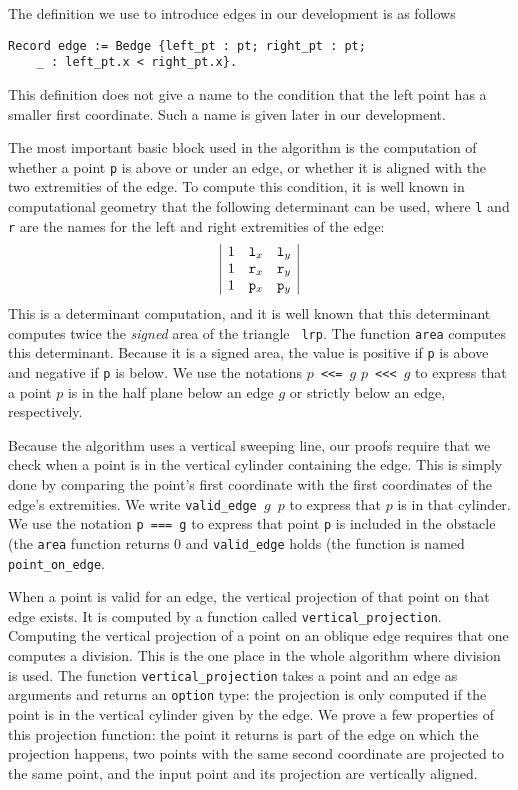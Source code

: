 \documentclass[a4paper, USenglish, cleveref, autoref, thm-restate]{lipics-v2021}
\begin{document}
The definition we use to introduce edges in our development is as
follows
\begin{verbatim}
Record edge := Bedge {left_pt : pt; right_pt : pt;
    _ : left_pt.x < right_pt.x}.
\end{verbatim}
This definition does not give a name to the condition that the left
point has a smaller first coordinate.  Such a name is given later in
our development.

The most important basic block used in the algorithm is the
computation of whether a point {\tt p} is above or under an edge, or whether
it is aligned with the two extremities of the edge.  To compute this
condition, it is well known in computational geometry \cite{Knuth} that the
following determinant can be used, where {\tt l} and {\tt r} are the
names for the left and right extremities of the edge:
\[\begin{array}{|ccc|}
1 & {\tt l}_x & {\tt l}_y\\
1 & {\tt r}_x & {\tt r}_y\\
1 & {\tt p}_x & {\tt p}_y\\
\end{array}\]
This is a determinant computation, and it is well known that this
determinant computes twice the {\em signed} area of the triangle {\tt
  lrp}.  The function {\tt area} computes this determinant.
Because it is a signed area, the value is positive if {\tt p}
is above and negative if {\tt p} is below.  We use the notations
{\tt \(p\) <{}<{}= \(g\)} {\tt \(p\) <{}<{}< \(g\)} to express that a point
\(p\) is in the half plane below an edge \(g\) or strictly below an
edge, respectively.

Because the algorithm uses a vertical sweeping line, our proofs
require that we check when a point is in the vertical cylinder
containing the edge.  This is simply done by comparing the point's
first coordinate with the first coordinates of the edge's extremities.
We write {\tt valid\_edge \(g\) \(p\)} to express that \(p\) is in
that cylinder.  We use the notation {\tt p === g} to express that
point {\tt p} is included in the obstacle (the {\tt area} function
returns 0 and {\tt valid\_edge} holds (the function is named
{\tt point\_on\_edge}.

When a point is valid for an edge, the vertical projection of that
point on that edge exists.  It is computed by a function called
{\tt vertical\_projection}.  Computing the vertical projection of a
point on an oblique edge requires that one computes a division.  This
is the one place in the whole algorithm where division is used.
The function {\tt vertical\_projection} takes a point and an edge as
arguments and returns an {\tt option} type:
the projection is only computed if the point is in the vertical
cylinder given by the edge.  We prove a few properties of this
projection function: the point it returns is part of the edge on which
the projection happens, two points with the same second coordinate are
projected to the same point, and the input point and its projection
are vertically aligned.
\end{document}
